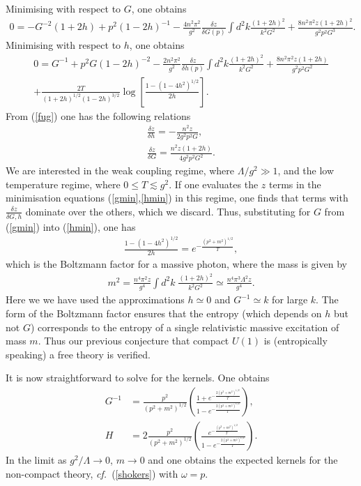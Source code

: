 \documentclass[a4paper,a4paper]{article}
\begin{document}
Minimising with respect to $G$, one obtains
\begin{gather} \label{gmin}
0 = - G^{-2}(1 +2h) + p^2 (1 -2h)^{-1} 
- \frac{4 n^2 \pi^2 }{g^2}\frac{\delta z}{\delta G(p)} \int d^2k \frac{(1+2h)^2}{k^2 G^2} 
+ \frac{8 n^2 \pi^2 z (1+2h)^2}{g^2 p^2 G^3}. 
\end{gather}
Minimising with respect to $h$, one obtains
\begin{multline} \label{hmin}
0 = G^{-1} + p^2 G (1-2h)^{-2}
- \frac{2 n^2 \pi^2 }{g^2}\frac{\delta z}{\delta h(p)} \int d^2k \frac{(1+2h)^2}{k^2 G^2}
+ \frac{8 n^2 \pi^2 z (1+2h)}{g^2 p^2 G^2} \\
+ \frac{2T}{(1+2h)^{1/2} (1-2h)^{3/2}} \log \left[ \frac{1- (1-4h^2)^{1/2}}{2h} \right].
\end{multline}
From (\ref{fug}) one has the following relations
\begin{gather}
\frac{\delta z}{\delta h } = - \frac{n^2 z}{2 g^2 p^2 G },\\ \frac{\delta z}{ \delta G } = \frac{n^2 z (1+2h) }{4 g^2 p^2 G^2}.
\end{gather}
We are interested in the weak coupling regime, where $\Lambda /g^2 \gg 1$, and the low temperature regime, 
where $0 \leq T \lesssim g^2$. If one evaluates the $z$ terms in the minimisation equations (\ref{gmin},\ref{hmin}) in this regime,
one finds that terms with $\frac{\delta z}{\delta G,h }$ dominate over the others, which we discard.
Thus, substituting for $G$ from (\ref{gmin}) into (\ref{hmin}), one has
\begin{gather}
\frac{1 - (1-4h^2)^{1/2}}{2h} = e^{-\frac{(p^2 + m^2)^{1/2}}{T}},
\end{gather}
which is the Boltzmann factor for a massive photon, where the mass is given by
\begin{gather} \label{mass}
m^2 =   \frac{n^4 \pi^2  z}{g^4} \int d^2k \; \frac{(1+2h)^2}{k^2 G^2} \simeq \frac{n^4 \pi^3 \Lambda^2 z}{g^4}.
\end{gather}
Here we we have used the approximations $h \simeq 0$ and $G^{-1} \simeq k$ for large $k$.
The form of the Boltzmann factor ensures that the entropy (which depends on $h$ but not $G$) corresponds to the entropy
of a single relativistic massive excitation of mass $m$. Thus our previous conjecture that compact $U(1)$ is (entropically speaking)
a free theory is verified.

It is now straightforward to solve for the kernels. One obtains
\begin{align} \label{kers}
G^{-1} &= \frac{p^2}{(p^2 +m^2)^{1/2}} 
\left( \frac{1+ e^{-\frac{2(p^2 +m^2)^{1/2}}{T}}}{1 - e^{-\frac{2(p^2 +m^2)^{1/2}}{T}}}\right), \nonumber \\
H &= 2\frac{p^2}{(p^2 +m^2)^{1/2}}
 \left( \frac{e^{-\frac{(p^2 +m^2)^{1/2}}{T}}}{1 - e^{-\frac{2(p^2 +m^2)^{1/2}}{T}}}\right).
\end{align}
In the limit as $g^2/\Lambda \rightarrow 0$, $ m \rightarrow 0$ and one obtains the expected
kernels for the non-compact theory, \emph{cf.\ }(\ref{shokers}) with $\omega=p$.
%
\end{document}

